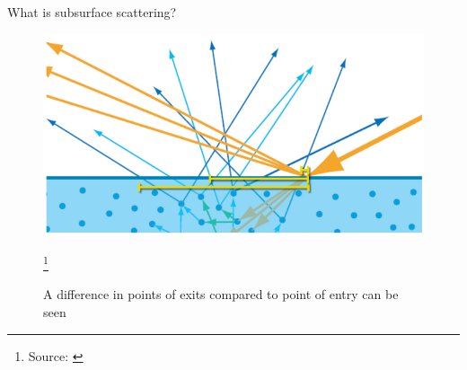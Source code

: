 \documentclass{f4_beamer_metropolis}
\newcommand\blfootnote[1]{%
  \begingroup
  \renewcommand\thefootnote{}\footnote{#1}%
  \addtocounter{footnote}{-1}%
  \endgroup
}
\begin{document}
\begin{frame}[t]{What is subsurface scattering?}
  \begin{figure}[!h]
    \centering
    \includegraphics[scale=0.3,keepaspectratio]{./images/subsurface-scattering-distance-difference.jpg}
    \caption{A difference in points of exits compared to point of entry can be seen}
    \blfootnote{Source: \cite{real-time-rendering}}
  \end{figure}

  \note{

  }
\end{frame}
\end{document}
